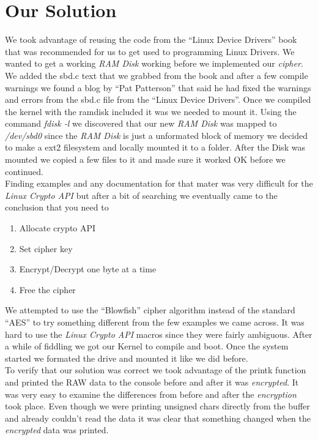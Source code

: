 \documentclass[letterpaper,10pt,notitlepage,fleqn]{article}
\begin{document}
\section*{Our Solution}
    We took advantage of reusing the code from the ``Linux Device Drivers'' book that 
    was recommended for us to get used to programming Linux Drivers. We wanted to get 
    a working \textit{RAM Disk} working before we implemented our \textit{cipher}. 
    We added the sbd.c text that we grabbed from the book and after a few compile warnings 
    we found a blog by ``Pat Patterson'' that said he had fixed the warnings and errors 
    from the sbd.c file from the ``Linux Device Drivers''. Once we compiled the kernel with 
    the ramdisk included it was we needed to mount it. Using the command \textit{fdisk -l} 
    we discovered that our new \textit{RAM Disk} was mapped to \textit{/dev/sbd0} 
    since the \textit{RAM Disk} is just a unformated block of memory we decided to make a 
    ext2 filesystem and locally mounted it to a folder. After the Disk was mounted we copied 
    a few files to it and made sure it worked OK before we continued.\\
    Finding examples and any documentation for that mater was very difficult for the 
    \textit{Linux Crypto API} but after a bit of searching we eventually came to the conclusion 
    that you need to
    \begin{enumerate}
        \item Allocate crypto API
        \item Set cipher key
        \item Encrypt/Decrypt one byte at a time
        \item Free the cipher
    \end{enumerate}
    We attempted to use the ``Blowfish'' cipher algorithm instead of the standard ``AES'' 
    to try something different from the few examples we came across. It was hard to use the 
    \textit{Linux Crypto API} macros since they were fairly ambiguous. After a while of fiddling 
    we got our Kernel to compile and boot. Once the system started we formated the drive and mounted 
    it like we did before.\\
    To verify that our solution was correct we took advantage of the printk function and printed the 
    RAW data to the console before and after it was \textit{encrypted}. It was very easy to examine 
    the differences from before and after the \textit{encryption} took place. Even though we were printing 
    unsigned chars directly from the buffer and already couldn't read the data it was clear that something 
    changed when the \textit{encrypted} data was printed.
\end{document}
